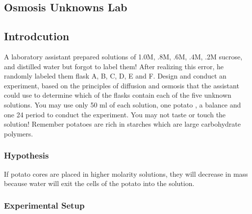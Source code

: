 \documentclass[letterpaper]{article}
\newcommand{\titleDOC}{}
\newcommand{\authorDOC}{Daniel Sabalakov}
\newcommand{\dateDOC}{\today}
\newcommand{\classDOC}{}
\begin{document}








\renewcommand{\titleDOC}{Osmosis Unknowns Lab}

\renewcommand{\classDOC}{DE Intro to Biology I}

\renewcommand{\dateDOC}{10/23/2025}

\renewcommand{\authorDOC}{Daniel Sabalakov, Turner Leduc, Jiles Tracz}



 \begin{doublespace} 

\section*{Osmosis Unknowns Lab}\label{osmosis-unknowns-lab}

\subsection*{Introdcution}\label{introdcution}

A laboratory assistant prepared solutions of 1.0M, .8M, .6M, .4M, .2M sucrose, and distilled water but forgot to label them! After realizing this error, he randomly labeled them flask A, B, C, D, E and F.
Design and conduct an experiment, based on the principles of diffusion and osmosis that the assistant could use to determine which of the flasks contain each of the five unknown solutions. You may use only 50 ml of each solution, one potato , a balance and one 24 period to conduct the experiment. You may not taste or touch the solution! Remember potatoes are rich in starches which are large carbohydrate polymers.

\subsubsection*{Hypothesis}\label{hypothesis}

If potato cores are placed in higher molarity solutions, they will decrease in mass because water will exit the cells of the potato into the solution.

\subsubsection*{Experimental Setup}\label{experimental-setup}


\end{doublespace}
\end{document}

